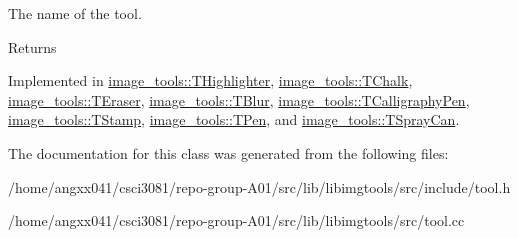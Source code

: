 The name of the tool. 

\begin{DoxyReturn}{Returns}

\end{DoxyReturn}


Implemented in \hyperlink{classimage__tools_1_1THighlighter_a741f3c465603450d443f7445ec87c670}{image\+\_\+tools\+::\+T\+Highlighter}, \hyperlink{classimage__tools_1_1TChalk_a74f65065dbc618e5f30089597d39bb46}{image\+\_\+tools\+::\+T\+Chalk}, \hyperlink{classimage__tools_1_1TEraser_a81b041c9389e310fa446fc9e69d2a82f}{image\+\_\+tools\+::\+T\+Eraser}, \hyperlink{classimage__tools_1_1TBlur_a9277f8a68498ab7eb27977ae369d1c69}{image\+\_\+tools\+::\+T\+Blur}, \hyperlink{classimage__tools_1_1TCalligraphyPen_adcc77e8eaf9fbd8d03eeba73f6f51f7b}{image\+\_\+tools\+::\+T\+Calligraphy\+Pen}, \hyperlink{classimage__tools_1_1TStamp_a1a1dec7161830a68bdaefbc0ec567855}{image\+\_\+tools\+::\+T\+Stamp}, \hyperlink{classimage__tools_1_1TPen_ace8f722fce340f23894f12ada93e2e8b}{image\+\_\+tools\+::\+T\+Pen}, and \hyperlink{classimage__tools_1_1TSprayCan_a550d5510cdf8dc826560dcbca9bedbd9}{image\+\_\+tools\+::\+T\+Spray\+Can}.



The documentation for this class was generated from the following files\+:\begin{DoxyCompactItemize}
\item 
/home/angxx041/csci3081/repo-\/group-\/\+A01/src/lib/libimgtools/src/include/tool.\+h\item 
/home/angxx041/csci3081/repo-\/group-\/\+A01/src/lib/libimgtools/src/tool.\+cc\end{DoxyCompactItemize}
